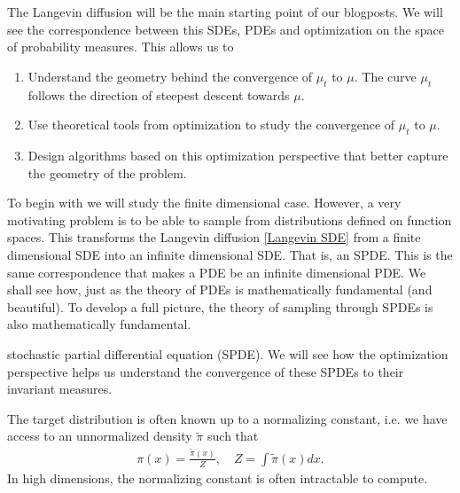 \documentclass[
    a4paper,
    DIV=14,
    abstract=true,
    numbers=noenddot
]
{scrartcl}
\theoremstyle{definition}
\begin{document}
The Langevin diffusion will be the main starting point of our blogposts. We will see the correspondence between this SDEs, PDEs and optimization on the space of probability measures.  This allows us to 
\begin{enumerate}
    \item Understand the geometry behind the convergence of $\mu_t$ to $\mu $. The curve $\mu_t$ follows the direction of steepest descent towards $\mu$.
    \item Use theoretical tools from optimization to study the convergence of $\mu_t$ to $\mu$.
    \item Design algorithms based on this optimization perspective that better capture the geometry of the problem.
\end{enumerate}
To begin with we will study the finite dimensional case. However, a very motivating problem is to be able to sample from distributions defined on function spaces. This transforms the Langevin diffusion \eqref{Langevin SDE} from a finite dimensional SDE into an infinite dimensional SDE. That is, an SPDE. This is the same correspondence that makes a PDE be an infinite dimensional PDE. We shall see how, just as the theory of PDEs is mathematically fundamental (and beautiful). To develop a full picture, the theory of sampling through SPDEs is also mathematically fundamental.


stochastic partial differential equation (SPDE). We will see how the optimization perspective helps us understand the convergence of these SPDEs to their invariant measures.


The target distribution is often known up to a normalizing constant, i.e. we have access to an unnormalized density $\tilde{\pi}$ such that
\begin{align*}
    \pi(x) = \frac{\tilde{\pi}(x)}{Z}, \quad Z = \int \tilde{\pi}(x) dx.
\end{align*}
In high dimensions, the normalizing constant is often intractable to compute.
\end{document}
